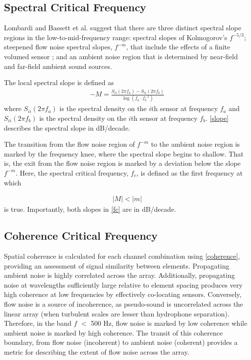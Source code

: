\documentclass[12pt,journal,onecolumn]{IEEEtran}
\begin{document}
\subsection{Spectral Critical Frequency}
Lombardi \cite{lombardi} and Bassett et al. \cite{bassett} suggest that there are three distinct spectral slope regions in the low-to-mid-frequency range: spectral slopes of Kolmogorov's $f^{-5/3}$; steepened flow noise spectral slopes, $f^{-m}$, that include the effects of a finite volumed sensor \cite{bassett}; and an ambient noise region that is determined by near-field and far-field ambient sound sources.

The local spectral slope is defined as
\begin{align}
-M = \frac{S_{ii}(2\pi f_a) - S_{ii}(2\pi f_b)}{\log(f_a \cdot f_b^{-1})}
\label{slope}
\end{align}
where $S_{ii}(2\pi f_a)$ is the spectral density on the $i$th sensor at frequency $f_a$ and $S_{ii}(2\pi f_b)$ is the spectral density on the $i$th sensor at frequency $f_b$. \eqref{slope} describes the spectral slope in dB/decade. 

The transition from the flow noise region of $f^{-m}$ to the ambient noise region is marked by the frequency knee, where the spectral slope begins to shallow. That is, the exit from the flow noise region is marked by a deviation below the slope $f^{-m}$. Here, the spectral critical frequency, $f_c$, is defined as the first frequency at which 

\begin{align}
|M| < |m|
\label{fc}
\end{align}
is true. Importantly, both slopes in \eqref{fc} are in dB/decade.



\subsection{Coherence Critical Frequency}
Spatial coherence is calculated for each channel combination using \eqref{coherence}, providing an assessment of signal similarity between elements. Propagating ambient noise is highly correlated across the array. Additionally, propagating noise at wavelengths sufficiently large relative to element spacing produces very high coherence at low frequencies by effectively co-locating sensors. Conversely, flow noise is a source of incoherence, as pseudo-sound is uncorrelated across the linear array (when turbulent scales are lesser than hydrophone separation). Therefore, in the band $f$ $<$ 500 Hz, flow noise is marked by low coherence while ambient noise is marked by high coherence. The transit of this coherence boundary, from flow noise (incoherent) to ambient noise (coherent) provides a metric for describing the extent of flow noise across the array. 
\end{document}
